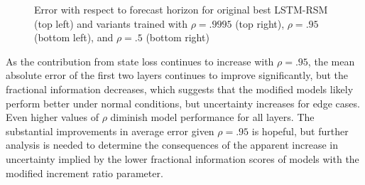 \begin{figure}[H]
    \caption{Error with respect to forecast horizon for original best LSTM-RSM (top left) and variants trained with $\rho=.9995$ (top right), $\rho=.95$ (bottom left), and $\rho=.5$ (bottom right)}
    \label{loss-fn-ratio-horizons}
\end{figure}

As the contribution from state loss continues to increase with $\rho=.95$, the mean absolute error of the first two layers continues to improve significantly, but the fractional information decreases, which suggests that the modified models likely perform better under normal conditions, but uncertainty increases for edge cases. Even higher values of $\rho$ diminish model performance for all layers. The substantial improvements in average error given $\rho=.95$ is hopeful, but further analysis is needed to determine the consequences of the apparent increase in uncertainty implied by the lower fractional information scores of models with the modified increment ratio parameter.

